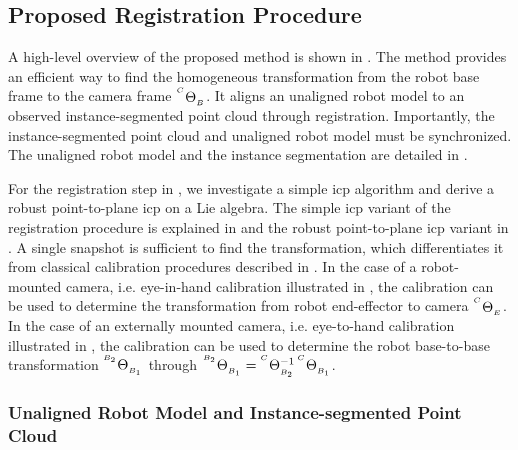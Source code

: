 
\subsection{Proposed Registration Procedure}
\label{c1:sec:proposed_calibration_procedure}
A high-level overview of the proposed method is shown in . The method provides an efficient way to find the homogeneous transformation from the robot base frame to the camera frame ${}^{^C}\Theta_{_B}$. It aligns an unaligned robot model to an observed instance-segmented point cloud through registration. Importantly, the instance-segmented point cloud and unaligned robot model must be synchronized. The unaligned robot model and the instance segmentation are detailed in . 

For the registration step in , we investigate a simple \acrshort{icp} algorithm and derive a robust point-to-plane \acrshort{icp} on a Lie algebra. The simple \acrshort{icp} variant of the registration procedure is explained in  and the robust point-to-plane \acrshort{icp} variant in . A single snapshot is sufficient to find the transformation, which differentiates it from classical calibration procedures described in . In the case of a robot-mounted camera, i.e. eye-in-hand calibration illustrated in , the calibration can be used to determine the transformation from robot end-effector to camera ${}^{^C}\Theta_{_E}$. In the case of an externally mounted camera, i.e. eye-to-hand calibration illustrated in , the calibration can be used to determine the robot base-to-base transformation ${}^{^{B_2}}\Theta_{_{B_1}}$ through ${}^{^{B_2}}\Theta_{_{B_1}} = {}^{^C}\Theta_{_{B_2}}^{-1}\,{}^{^C}\Theta_{_{B_1}}$.

\subsubsection{Unaligned Robot Model and Instance-segmented Point Cloud}
\label{c1:sec:unaligned_robot_model_and_instance_segmented_point_cloud}
